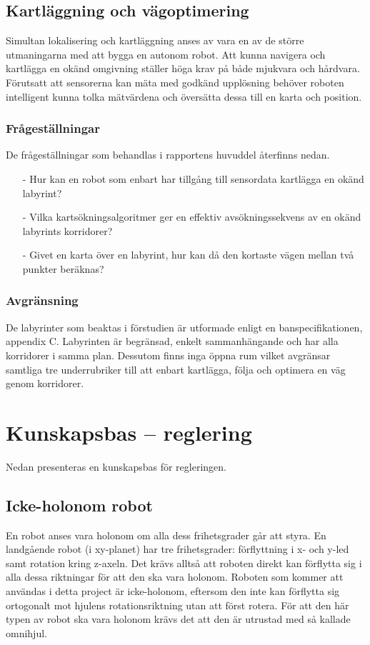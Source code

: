 \documentclass[11pt]{article}
\begin{document}
\begin{flushleft}
\subsection{Kartläggning och vägoptimering}
Simultan lokalisering och kartläggning anses av \cite{grail} vara en av de större utmaningarna med att bygga en autonom robot. Att kunna navigera och kartlägga en okänd omgivning ställer höga krav på både mjukvara och hårdvara. Förutsatt att sensorerna kan mäta med godkänd upplösning behöver roboten intelligent kunna tolka mätvärdena och översätta dessa till en karta och position. 

\subsubsection{Frågeställningar}
De frågeställningar som behandlas i rapportens huvuddel återfinns nedan.
\begin{itemize}
	\item [-] Hur kan en robot som enbart har tillgång till sensordata kartlägga en okänd labyrint?
	\item [-] Vilka kartsökningsalgoritmer ger en effektiv avsökningssekvens av en okänd labyrints korridorer?
	\item [-] Givet en karta över en labyrint, hur kan då den kortaste vägen mellan två punkter beräknas?
\end{itemize}
\subsubsection{Avgränsning}
De labyrinter som beaktas i förstudien är utformade enligt en banspecifikationen, appendix C. Labyrinten är begränsad, enkelt sammanhängande och har alla korridorer i samma plan. Dessutom finns inga öppna rum vilket avgränsar samtliga tre underrubriker till att enbart kartlägga, följa och optimera en väg genom korridorer. 


\pagebreak
\section{Kunskapsbas -- reglering}
Nedan presenteras en kunskapsbas för regleringen.
\subsection{Icke-holonom robot}
En robot anses vara holonom om alla dess frihetsgrader går att styra. En landgående robot (i xy-planet) har tre frihetsgrader: förflyttning i x- och y-led samt rotation kring z-axeln. Det krävs alltså att roboten direkt kan förflytta sig i alla dessa riktningar för att den ska vara holonom. Roboten som kommer att användas i detta project är icke-holonom, eftersom den inte kan förflytta sig ortogonalt mot hjulens rotationsriktning utan att först rotera. För att den här typen av robot ska vara holonom krävs det att den är utrustad med så kallade omnihjul.


\end{flushleft}
\end{document}
